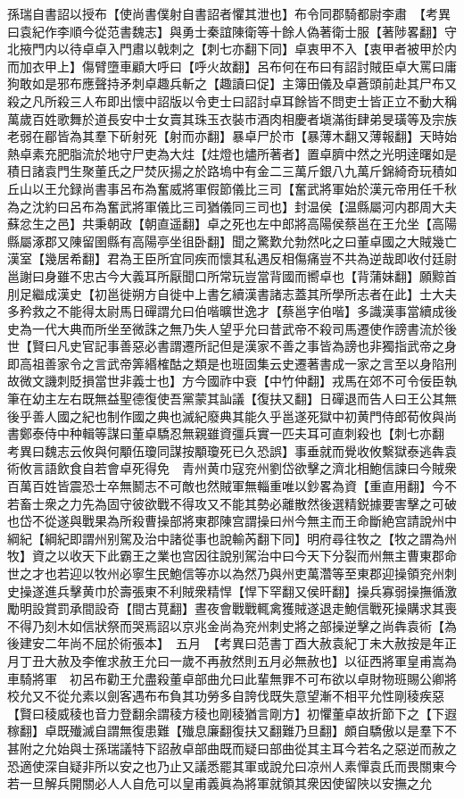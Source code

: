 孫瑞自書詔以授布【使尚書僕射自書詔者懼其泄也】布令同郡騎都尉李肅　【考異曰袁紀作李順今從范書魏志】與勇士秦誼陳衛等十餘人偽著衛士服【著陟畧翻】守北掖門内以待卓卓入門肅以戟刺之【刺七亦翻下同】卓衷甲不入【衷甲者被甲於内而加衣甲上】傷臂墮車顧大呼曰【呼火故翻】呂布何在布曰有詔討賊臣卓大罵曰庸狗敢如是邪布應聲持矛刺卓趣兵斬之【趣讀曰促】主簿田儀及卓蒼頭前赴其尸布又殺之凡所殺三人布即出懷中詔版以令吏士曰詔討卓耳餘皆不問吏士皆正立不動大稱萬歲百姓歌舞於道長安中士女賣其珠玉衣裝市酒肉相慶者塡滿街肆弟旻璜等及宗族老弱在郿皆為其羣下斫射死【射而亦翻】暴卓尸於市【暴薄木翻又薄報翻】天時始熱卓素充肥脂流於地守尸吏為大炷【炷燈也燼所著者】置卓臍中然之光明逹曙如是積日諸袁門生聚董氏之尸焚灰揚之於路塢中有金二三萬斤銀八九萬斤錦綺奇玩積如丘山以王允録尚書事呂布為奮威將軍假節儀比三司【奮武將軍始於漢元帝用任千秋為之沈約曰呂布為奮武將軍儀比三司猶儀同三司也】封温侯【温縣屬河内郡周大夫蘇忿生之邑】共秉朝政【朝直遥翻】卓之死也左中郎將高陽侯蔡邕在王允坐【高陽縣屬涿郡又陳留圉縣有高陽亭坐徂卧翻】聞之驚歎允勃然叱之曰董卓國之大賊幾亡漢室【幾居希翻】君為王臣所宜同疾而懷其私遇反相傷痛豈不共為逆哉即收付廷尉邕謝曰身雖不忠古今大義耳所厭聞口所常玩豈當背國而嚮卓也【背蒲妹翻】願黥首刖足繼成漢史【初邕徙朔方自徙中上書乞續漢書諸志蓋其所學所志者在此】士大夫多矜救之不能得太尉馬日磾謂允曰伯喈曠世逸才【蔡邕字伯喈】多識漢事當續成後史為一代大典而所坐至微誅之無乃失人望乎允曰昔武帝不殺司馬遷使作謗書流於後世【賢曰凡史官記事善惡必書謂遷所記但是漢家不善之事皆為謗也非獨指武帝之身即高祖善家令之言武帝筭緡榷酤之類是也班固集云史遷著書成一家之言至以身陷刑故微文譏刺貶損當世非義士也】方今國祚中衰【中竹仲翻】戎馬在郊不可令佞臣執筆在幼主左右既無益聖德復使吾黨蒙其訕議【復扶又翻】日磾退而告人曰王公其無後乎善人國之紀也制作國之典也滅紀廢典其能久乎邕遂死獄中初黄門侍郎荀攸與尚書鄭泰侍中种輯等謀曰董卓驕忍無親雖資彊兵實一匹夫耳可直刺殺也【刺七亦翻　考異曰魏志云攸與何顒伍瓊同謀按顒瓊死已久恐誤】事垂就而覺收攸繫獄泰逃犇袁術攸言語飲食自若會卓死得免　青州黄巾寇兖州劉岱欲擊之濟北相鮑信諫曰今賊衆百萬百姓皆震恐士卒無鬭志不可敵也然賊軍無輜重唯以鈔畧為資【重直用翻】今不若畜士衆之力先為固守彼欲戰不得攻又不能其勢必離散然後選精鋭據要害擊之可破也岱不從遂與戰果為所殺曹操部將東郡陳宫謂操曰州今無主而王命斷絶宫請說州中綱紀【綱紀即謂州别駕及治中諸從事也說輸芮翻下同】明府尋往牧之【牧之謂為州牧】資之以收天下此霸王之業也宫因往說别駕治中曰今天下分裂而州無主曹東郡命世之才也若迎以牧州必寧生民鮑信等亦以為然乃與州吏萬濳等至東郡迎操領兖州刺史操遂進兵擊黄巾於壽張東不利賊衆精悍【悍下罕翻又侯旰翻】操兵寡弱操撫循激勵明設賞罰承間設奇【間古莧翻】晝夜會戰戰輒禽獲賊遂退走鮑信戰死操購求其喪不得乃刻木如信狀祭而哭焉詔以京兆金尚為兖州刺史將之部操逆擊之尚犇袁術【為後建安二年尚不屈於術張本】　五月　【考異曰范書丁酉大赦袁紀丁未大赦按是年正月丁丑大赦及李傕求赦王允曰一歲不再赦然則五月必無赦也】以征西將軍皇甫嵩為車騎將軍　初呂布勸王允盡殺董卓部曲允曰此輩無罪不可布欲以卓財物班賜公卿將校允又不從允素以劍客遇布布負其功勞多自誇伐既失意望漸不相平允性剛稜疾惡【賢曰稜威稜也音力登翻余謂稜方稜也剛稜猶言剛方】初懼董卓故折節下之【下遐稼翻】卓既殱滅自謂無復患難【殱息廉翻復扶又翻難乃旦翻】頗自驕傲以是羣下不甚附之允始與士孫瑞議特下詔赦卓部曲既而疑曰部曲從其主耳今若名之惡逆而赦之恐適使深自疑非所以安之也乃止又議悉罷其軍或說允曰凉州人素憚袁氏而畏關東今若一旦解兵開關必人人自危可以皇甫義眞為將軍就領其衆因使留陜以安撫之允